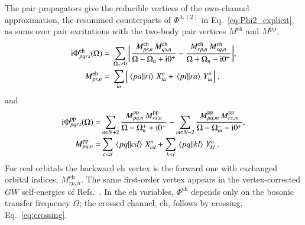 \documentclass[aip,jcp,reprint,noshowkeys,superscriptaddress]{revtex4-1}
\newcommand{\ii}{\mathrm{i}}
\newcommand{\eh}{\text{eh}}
\newcommand{\teh}{\overline{\text{eh}}}
\newcommand{\pp}{\text{pp}}
\begin{document}
The pair propagators give the reducible vertices of the own-channel
approximation, the resummed counterparts of $\Phi^{\lambda,(2)}$ in
Eq.~\eqref{eq:Phi2_explicit}, as sums over pair excitations with the
two-body pair vertices $M^{\eh}$ and $M^{\pp}$,
\begin{align}
\ii\Phi^{\eh}_{pqrs}(\Omega)
={}&
\sum_{\Omega_n>0}
\bigg[
\frac{M^{\eh}_{pr,n}\,M^{\eh}_{qs,n}}{\Omega-\Omega_n+\ii0^+}
-
\frac{M^{\eh}_{rp,n}\,M^{\eh}_{sq,n}}{\Omega+\Omega_n-\ii0^+}
\bigg],
\nonumber\\
M^{\eh}_{pr,n}
={}&
\sum_{ia}\Big[\mel{pa}{}{ri}\,X^n_{ia}+\mel{pi}{}{ra}\,Y^n_{ia}\Big] \;,
\label{eq:Phi_eh_phonons}
\end{align}
and
\begin{align}
\ii\Phi^{\pp}_{pqrs}(\Omega)
= & 
\sum_{n\in N+2}
\frac{M^{\pp}_{pq,n}\,M^{\pp}_{rs,n}}{\Omega-\Omega^{+}_n+\ii0^+}
-
\sum_{m\in N-2}
\frac{M^{\pp}_{pq,m}\,M^{\pp}_{rs,m}}{\Omega-\Omega^{-}_m-\ii0^+},
\nonumber\\
M^{\pp}_{pq,n}
= & 
\sum_{c<d}\mel{pq}{}{cd}\,X^n_{cd}
+\sum_{k<l}\mel{pq}{}{kl}\,Y^n_{kl} \;.
\label{eq:Phi_pp_phonons}
\end{align}
For real orbitals the backward $\eh$ vertex is the forward one with
exchanged orbital indices, $M^{\eh}_{rp,n}$. The same first-order vertex
appears in the vertex-corrected $GW$ self-energies of
Refs.~. In the $\eh$
variables, $\Phi^{\eh}$ depends only on the bosonic transfer frequency
$\Omega$; the crossed channel, $\teh$, follows by crossing,
Eq.~\eqref{eq:crossing}.
\end{document}
